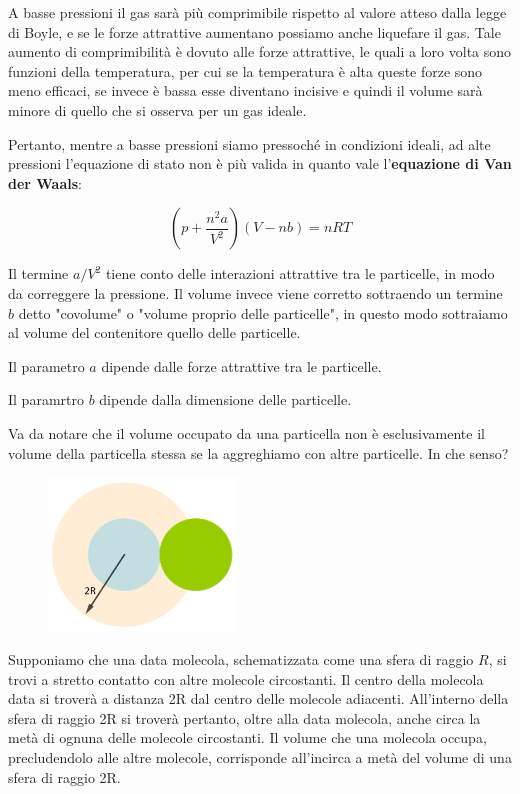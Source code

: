 A basse pressioni il gas sarà più comprimibile rispetto al valore atteso dalla legge di Boyle, e se le forze attrattive aumentano possiamo anche liquefare il gas. Tale aumento di comprimibilità è dovuto alle forze attrattive, le quali a loro volta sono funzioni della temperatura, per cui se la temperatura è alta queste forze sono meno efficaci, se invece è bassa esse diventano incisive e quindi il volume sarà minore di quello che si osserva per un gas ideale.

Pertanto, mentre a basse pressioni siamo pressoché in condizioni ideali, ad alte pressioni l'equazione di stato non è più valida in quanto vale l'\textbf{equazione di Van der Waals}:

$$\left( p + \frac{n^2a}{V^2} \right)(V-nb)=nRT$$

Il termine $a/V^2$ tiene conto delle interazioni attrattive tra le particelle, in modo da correggere la pressione. Il volume invece viene corretto sottraendo un termine $b$ detto "covolume" o "volume proprio delle particelle", in questo modo sottraiamo al volume del contenitore quello delle particelle.

Il parametro $a$ dipende dalle forze attrattive tra le particelle.

Il paramrtro $b$ dipende dalla dimensione delle particelle.

\vspace{0.2cm}Va da notare che il volume occupato da una particella non è esclusivamente il volume della particella stessa se la aggreghiamo con altre particelle. In che senso?

\hspace{0.5cm}\begin{minipage}{0.35 \textwidth}
    \begin{figure}[H]
        \includegraphics[width=5cm]{immagini/particelle_aggregate.png}
    \end{figure}
\end{minipage}
\begin{minipage}{0.6 \textwidth}
    \vspace{0.8cm}Supponiamo che una data molecola, schematizzata come una sfera di raggio $R$, si trovi a stretto contatto con altre molecole circostanti.
    Il centro della molecola data si troverà a distanza 2R dal centro delle
    molecole adiacenti. All’interno della sfera di raggio 2R si troverà pertanto, oltre alla data molecola, anche circa la metà di ognuna delle molecole circostanti.
    Il volume che una molecola occupa, precludendolo alle altre molecole, corrisponde all’incirca a metà del volume di una sfera di raggio 2R. 
\end{minipage}

